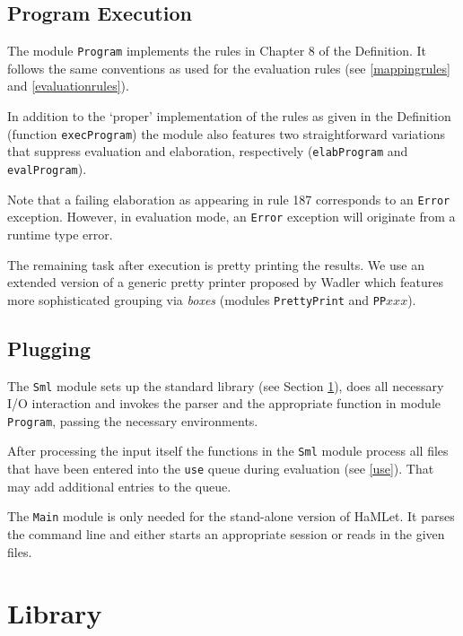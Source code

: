 \documentclass[twoside,titlepage]{article}
\begin{document}
\subsection{Program Execution}
\label{execution}

The module {\tt Program} implements the rules in Chapter 8 of the Definition. It follows the same conventions as used for the evaluation rules (see \ref{mappingrules} and \ref{evaluationrules}).

In addition to the `proper' implementation of the rules as given in the Definition (function {\tt execProgram}) the module also features two straightforward variations that suppress evaluation and elaboration, respectively ({\tt elabProgram} and {\tt evalProgram}).

Note that a failing elaboration as appearing in rule 187 corresponds to an {\tt Error} exception. However, in evaluation mode, an {\tt Error} exception will originate from a runtime type error.

The remaining task after execution is pretty printing the results. We use an extended version of a generic pretty printer proposed by Wadler \cite{pretty} which features more sophisticated grouping via {\em boxes} (modules {\tt PrettyPrint} and {\tt PP}$xxx$).


\subsection{Plugging}
\label{plugging}

The {\tt Sml} module sets up the standard library (see Section \ref{lib}), does all necessary I/O interaction and invokes the parser and the appropriate function in module {\tt Program}, passing the necessary environments.

After processing the input itself the functions in the {\tt Sml} module process all files that have been entered into the {\tt use} queue during evaluation (see \ref{use}). That may add additional entries to the queue.

The {\tt Main} module is only needed for the stand-alone version of HaMLet. It parses the command line and either starts an appropriate session or reads in the given files.


\section{Library}
\label{lib}
\end{document}
